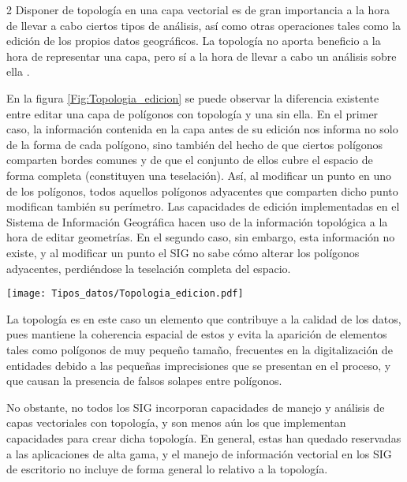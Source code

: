 \begin{multicols}{2}
Disponer de topología en una capa vectorial es de gran importancia a la hora de llevar a cabo ciertos tipos de análisis, así como otras operaciones tales como la edición de los propios datos geográficos. La topología no aporta beneficio a la hora de representar una capa, pero sí a la hora de llevar a cabo un análisis sobre ella \cite{Herring1987Autocarto}. 

En la figura \ref{Fig:Topologia_edicion} se puede observar la diferencia existente entre editar una capa de polígonos con topología y una sin ella. En el primer caso, la información contenida en la capa antes de su edición nos informa no solo de la forma de cada polígono, sino también del hecho de que ciertos polígonos comparten bordes comunes y de que el conjunto de ellos cubre el espacio de forma completa (constituyen una teselación). Así, al modificar un punto en uno de los polígonos, todos aquellos polígonos adyacentes que comparten dicho punto modifican también su perímetro. Las capacidades de edición implementadas en el Sistema de Información Geográfica hacen uso de la información topológica a la hora de editar geometrías. En el segundo caso, sin embargo, esta información no existe, y al modificar un punto el SIG no sabe cómo alterar los polígonos adyacentes, perdiéndose la teselación completa del espacio.

\begin{figure*}[ht]   
\centering
\texttt{[image: Tipos\_datos/Topologia\_edicion.pdf]}
\caption{\small Diferencias entre la edición (desplazamiento de un punto) no disponiendo de topología (a) o con ella (b).}
\label{Fig:Topologia_edicion} 
\end{figure*}

La topología es en este caso un elemento que contribuye a la calidad de los datos, pues mantiene la coherencia espacial de estos y evita la aparición de elementos tales como polígonos de muy pequeño tamaño, frecuentes en la digitalización de entidades debido a las pequeñas imprecisiones que se presentan en el proceso, y que causan la presencia de falsos solapes entre polígonos.

No obstante, no todos los SIG incorporan capacidades de manejo y análisis de capas vectoriales con topología, y son menos aún los que implementan capacidades para crear dicha topología. En general, estas han quedado reservadas a las aplicaciones de alta gama, y el manejo de información vectorial en los SIG de escritorio no incluye de forma general lo relativo a la topología.


\end{multicols}
